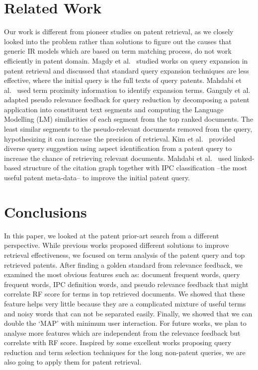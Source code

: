 \documentclass{sig-alternate}
\begin{document}
\section{Related Work}
Our work is different from pioneer studies on patent retrieval, as we closely looked into the problem rather than solutions to figure out the causes that generic IR models which are based on term matching process, do not work efficiently in patent domain. Magdy et al.~\cite{magdy2011study} studied works on query expansion in patent retrieval and discussed that standard query expansion techniques are less effective, where the initial query is the full texts of query patents. Mahdabi et al.~\cite{Mahdabi2013} used term proximity information to identify expansion terms. Ganguly et al.~\cite{ganguly2011patent} adapted pseudo relevance feedback for query reduction by decomposing a patent application into constituent text segments and computing the Language Modelling (LM) similarities of each segment from the top ranked documents. The least similar segments to the pseudo-relevant documents removed from the query, hypothesizing it can increase the precision of retrieval. Kim et al.~\cite{kim2014diversifying} provided diverse query suggestion using aspect identification from a patent query to increase the chance of retrieving relevant documents. Mahdabi et al.~\cite{mahdabi2014patent} used linked-based structure of the citation graph together with IPC classification --the most useful patent meta-data-- to improve the initial patent query. 
\section{Conclusions}
In this paper, we looked at the patent prior-art search from a different perspective. While previous works proposed different solutions to improve retrieval effectiveness, we focused on term analysis of the patent query and top retrieved patents. After finding a golden standard from relevance feedback, we examined the most obvious features such as: document frequent words, query frequent words, IPC definition words, and pseudo relevance feedback that might correlate RF score for terms in top retrieved documents. We showed that these feature helps very little because they are a complicated mixture of useful terms and noisy words that can not be separated easily. Finally, we showed that we can double the `MAP' with minimum user interaction. 
For future works, we plan to analyse more features which are independent from the relevance feedback but correlate with RF score. Inspired by some excellent works proposing query reduction and term selection techniques for the long non-patent queries\cite{maxwell2013compact}\cite{kumaran2009reducing}, we are also going to apply them for patent retrieval.   
\end{document}
